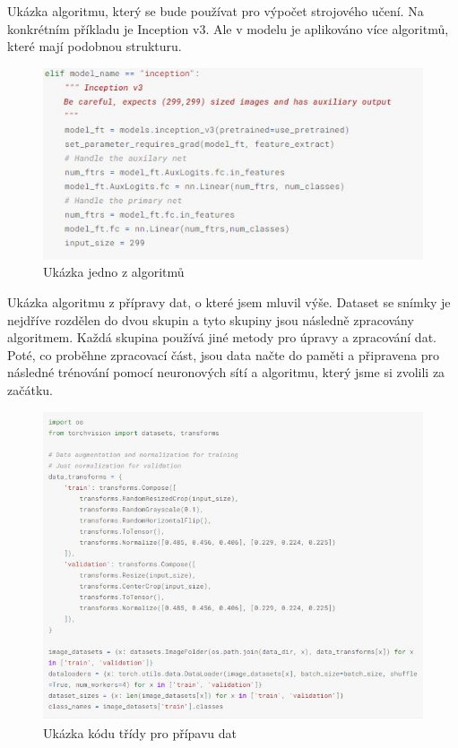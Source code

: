 \documentclass[journal]{IEEEtran}
\begin{document}
Ukázka algoritmu, který se bude používat pro výpočet strojového učení. Na konkrétním příkladu je Inception v3. Ale v modelu je aplikováno více algoritmů, které mají podobnou strukturu. 

\begin{figure}[h!]
  \includegraphics[width=\linewidth]{images/Inception.JPG}
  \caption{Ukázka jedno z algoritmů}
\end{figure}

Ukázka algoritmu z přípravy dat, o které jsem mluvil výše. Dataset se snímky je nejdříve rozdělen do dvou skupin a tyto skupiny jsou následně zpracovány algoritmem. Každá skupina používá jiné metody pro úpravy a zpracování dat. Poté, co proběhne zpracovací část, jsou data načte do paměti a připravena pro následné trénování pomocí neuronových sítí a algoritmu, který jsme si zvolili za začátku. 

\begin{figure}[h!]
  \includegraphics[width=\linewidth]{images/Dataprep.JPG}
  \caption{Ukázka kódu třídy pro přípavu dat}
\end{figure}
\end{document}
